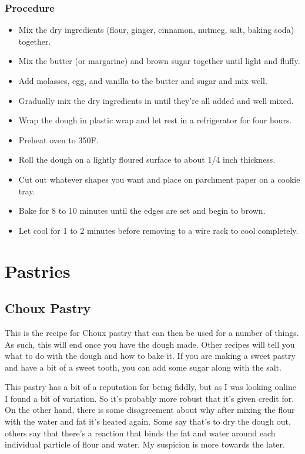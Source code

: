 \documentclass[10pt, openany]{book}
\begin{document}
\subsection{Procedure}
\begin{itemize}
  \item Mix the dry ingredients (flour, ginger, cinnamon, nutmeg, salt, baking soda) together.
  \item Mix the butter (or margarine) and brown sugar together until light and fluffy.
  \item Add molasses, egg, and vanilla to the butter and sugar and mix well.
  \item Gradually mix the dry ingredients in until they're all added and well mixed.
  \item Wrap the dough in plastic wrap and let rest in a refrigerator for four hours.
  \item Preheat oven to 350\degree{}F.
  \item Roll the dough on a lightly floured surface to about 1/4 inch thickness.
  \item Cut out whatever shapes you want and place on parchment paper on a cookie tray.
  \item Bake for 8 to 10 minutes until the edges are set and begin to brown.
  \item Let cool for 1 to 2 minutes before removing to a wire rack to cool completely.
\end{itemize}

\chapter{Pastries}
\section{Choux Pastry}
\label{pastry:choux}
This is the recipe for Choux pastry that can then be used for a number of things.  As such, this will end once you have the dough made.  Other recipes will tell you what to do with the dough and how to bake it.  If you are making a sweet pastry and have a bit of a sweet tooth, you can add some sugar along with the salt.

This pastry has a bit of a reputation for being fiddly, but as I was looking online I found a bit of variation.  So it's probably more robust that it's given credit for.  On the other hand, there is some disagreement about why after mixing the flour with the water and fat it's heated again.  Some say that's to dry the dough out, others say that there's a reaction that binds the fat and water around each individual particle of flour and water.  My suspicion is more towards the later.
\end{document}

